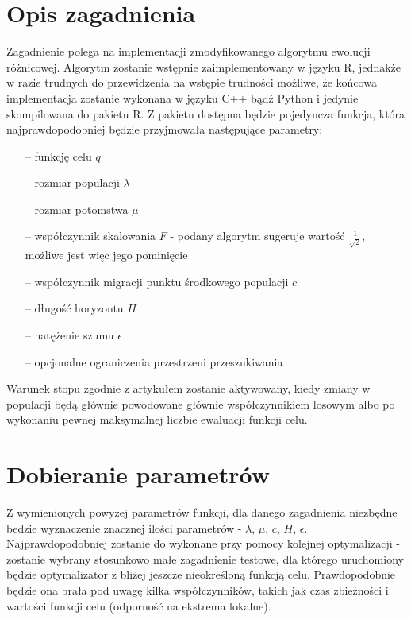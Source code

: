 \section{Opis zagadnienia}
Zagadnienie polega na implementacji zmodyfikowanego algorytmu ewolucji różnicowej. Algorytm zostanie wstępnie zaimplementowany w języku R, jednakże w razie trudnych do przewidzenia na wstępie trudności możliwe, że końcowa implementacja zostanie wykonana w języku C++ bądź Python i jedynie skompilowana do pakietu R. Z pakietu dostępna będzie pojedyncza funkcja, która najprawdopodobniej będzie przyjmowała następujące parametry:

\begin{itemize}
\item[--] funkcję celu $q$
\item[--] rozmiar populacji $\lambda$
\item[--] rozmiar potomstwa $\mu$
\item[--] współczynnik skalowania $F$ - podany algorytm sugeruje wartość $ \frac{1}{\sqrt{2}} $, możliwe jest więc jego pominięcie
\item[--] współczynnik migracji punktu środkowego populacji $c$
\item[--] długość horyzontu $H$
\item[--] natężenie szumu $\epsilon$
\item[--] opcjonalne ograniczenia przestrzeni przeszukiwania
\end{itemize}

Warunek stopu zgodnie z artykułem zostanie aktywowany, kiedy zmiany w populacji będą głównie powodowane głównie współczynnikiem losowym albo po wykonaniu pewnej maksymalnej liczbie ewaluacji funkcji celu.

\section{Dobieranie parametrów}

Z wymienionych powyżej parametrów funkcji, dla danego zagadnienia niezbędne bedzie wyznaczenie znacznej ilości parametrów - $\lambda$, $\mu$, $c$, $H$, $\epsilon$. Najprawdopodobniej zostanie do wykonane przy pomocy kolejnej optymalizacji - zostanie wybrany stosunkowo małe zagadnienie testowe, dla którego uruchomiony będzie optymalizator z bliżej jeszcze nieokreśloną funkcją celu. Prawdopodobnie będzie ona brała pod uwagę kilka współczynników, takich jak czas zbieżności i wartości funkcji celu (odporność na ekstrema lokalne).

